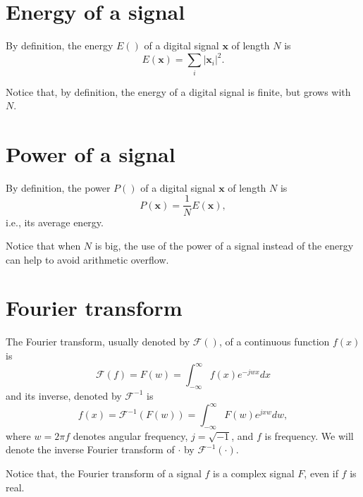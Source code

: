 \section{Energy of a signal}
\label{sec:energy_signal}

By definition, the energy $E()$ of a digital signal $\mathbf{x}$ of
length $N$ is
\begin{equation}
  E(\mathbf{x}) = \sum_{i}|\mathbf{x}_i|^2.
\end{equation}

Notice that, by definition, the energy of a digital signal is finite,
but grows with $N$.


\section{Power of a signal}
\label{sec:power_signal}

By definition, the power $P()$ of a digital signal
$\mathbf{x}$ of length $N$ is
\begin{equation}
  P(\mathbf{x}) = \frac{1}{N}E(\mathbf{x}),
\end{equation}
i.e., its average energy.

Notice that when $N$ is big, the use of the power of a signal instead
of the energy can help to avoid arithmetic overflow.


\section{Fourier transform}
\label{sec:Fourier_transform}

The Fourier transform, usually denoted by $\mathcal{F}()$, of a
continuous function $f(x)$ is
\begin{equation}
  \mathcal{F}(f) = F(w) = \int_{-\infty}^{\infty}f(x)e^{-jwx}dx
  \label{eq:FT}
\end{equation}
and its inverse, denoted by $\mathcal{F}^{-1}$ is
\begin{equation}
  f(x) = \mathcal{F}^{-1}(F(w)) = \int_{-\infty}^{\infty}F(w)e^{jxw}dw,
\end{equation}
where $w=2\pi f$ denotes angular frequency, $j=\sqrt{-1}$, and
$f$ is frequency. We will denote the inverse Fourier transform of
$\cdot$ by $\mathcal{F}^{-1}(\cdot)$.

Notice that, the Fourier transform of a signal $f$ is a complex signal
$F$, even if $f$ is real.

